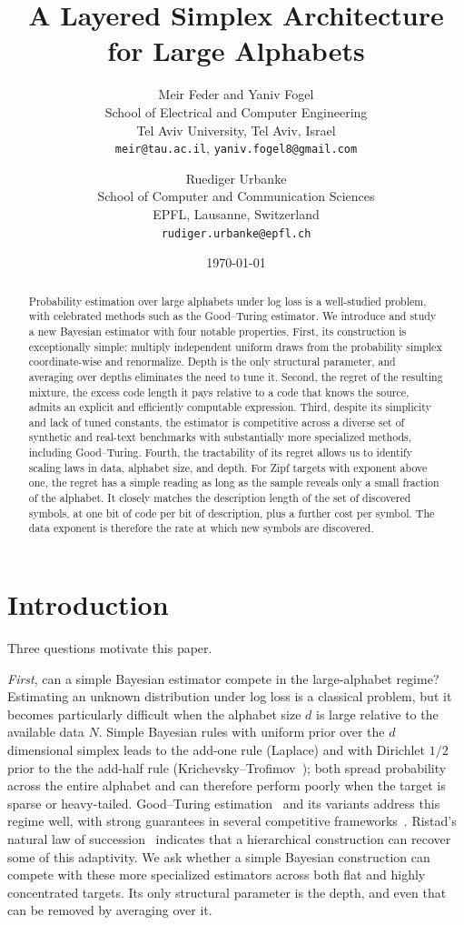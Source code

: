 \documentclass[11pt]{article}
\title{A Layered Simplex Architecture for Large Alphabets}
\author{
  Meir Feder and Yaniv Fogel\\
  School of Electrical and Computer Engineering\\
  Tel Aviv University, Tel Aviv, Israel\\
  \texttt{meir@tau.ac.il}, \texttt{yaniv.fogel8@gmail.com}
  \and
  Ruediger Urbanke\\
  School of Computer and Communication Sciences\\
  EPFL, Lausanne, Switzerland\\
  \texttt{rudiger.urbanke@epfl.ch}
}
\date{\today}
\begin{document}
\maketitle
\begin{abstract}
Probability estimation over large alphabets under log loss is a well-studied problem, with celebrated methods such as the Good--Turing estimator. We introduce and study a new Bayesian estimator with four notable properties. First, its construction is exceptionally simple: multiply independent uniform draws from the probability simplex coordinate-wise and renormalize. Depth is the only structural parameter, and averaging over depths eliminates the need to tune it. Second, the regret of the resulting mixture, the excess code length it pays
relative to a code that knows the source, admits an explicit and efficiently
computable expression. Third, despite its simplicity and lack of tuned constants, the estimator is competitive across a diverse set of synthetic and real-text benchmarks with substantially more specialized methods, including Good--Turing.
Fourth, the tractability of its regret allows us to identify scaling
laws in data, alphabet size, and depth. For Zipf targets with exponent
above one, the regret has a simple reading as long as the
sample reveals only a small fraction of the alphabet. It closely matches the
description length of the set of discovered symbols, at one bit of code per
bit of description, plus a further cost per symbol. The data exponent is
therefore the rate at which new symbols are discovered.
\end{abstract}

\section{Introduction}
\label{sec:intro}
Three questions motivate this paper.

\emph{First}, can a simple Bayesian estimator compete in the
large-alphabet regime?
Estimating an unknown distribution under log loss is a classical problem,
but it becomes particularly difficult when the alphabet size $d$ is large relative to the available data $N$.
Simple Bayesian rules with uniform prior over the $d$ dimensional simplex leads to the add-one rule (Laplace) and with Dirichlet $1/2$ prior to the the add-half rule
(Krichevsky--Trofimov~\cite{krichevsky1981performance}); both spread probability
across the entire alphabet and can therefore perform poorly when the target
is sparse or heavy-tailed.
Good--Turing estimation~\cite{good1953population} and its variants address
this regime well, with strong guarantees in several competitive
frameworks~\cite{orlitsky2003always,mcallester2000leave,acharya2013tight,
orlitsky2015competitive}.
Ristad's natural law of succession~\cite{ristad1995natural} indicates that a
hierarchical construction can recover some of this adaptivity.
We ask whether a simple Bayesian construction can compete with these more
specialized estimators across both flat and highly concentrated targets.
Its only structural parameter is the depth, and even that can be removed
by averaging over it.
\end{document}
